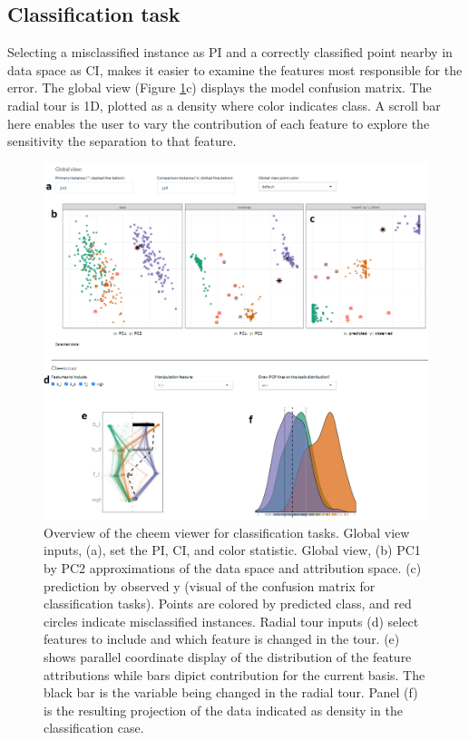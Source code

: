 \documentclass[
]{article}
\begin{document}
\hypertarget{classification-task}{%
\subsection{Classification task}\label{classification-task}}

Selecting a misclassified instance as PI and a correctly classified point nearby in data space as CI, makes it easier to examine the features most responsible for the error. The global view (Figure \ref{fig:classificationcase}c) displays the model confusion matrix. The radial tour is 1D, plotted as a density where color indicates class. A scroll bar here enables the user to vary the contribution of each feature to explore the sensitivity the separation to that feature.

\begin{figure}

{\centering \includegraphics[width=1\linewidth]{./figures/app_classification} 

}

\caption{Overview of the cheem viewer for classification tasks. Global view inputs, (a), set the PI, CI, and color statistic. Global view, (b) PC1 by PC2 approximations of the data space and attribution space. (c) prediction by observed y (visual of the confusion matrix for classification tasks). Points are colored by predicted class, and red circles indicate misclassified instances. Radial tour inputs (d) select features to include and which feature is changed in the tour. (e) shows parallel coordinate display of the distribution of the feature attributions while bars dipict contribution for the current basis. The black bar is the variable being changed in the radial tour. Panel (f) is the resulting projection of the data indicated as density in the classification case.}\label{fig:classificationcase}
\end{figure}
\end{document}

